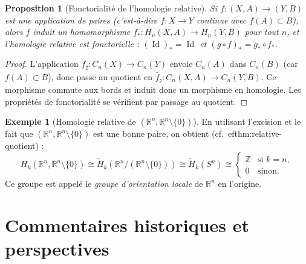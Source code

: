\documentclass[12pt,a4paper,openany]{book}
\theoremstyle{definition}
\newtheorem{exemple}[definition]{Exemple}
\theoremstyle{plain}
\newtheorem{proposition}[definition]{Proposition}
\theoremstyle{remark}
\newcommand{\Z}{\mathbb{Z}}
\newcommand{\R}{\mathbb{R}}
\DeclareMathOperator{\Id}{Id}
\begin{document}
\begin{proposition}[Fonctorialité de l'homologie relative]\label{prop:fonctorialite-relative}
Si $f \colon (X, A) \to (Y, B)$ est une application de paires (c'est-à-dire $f \colon X \to Y$
continue avec $f(A) \subset B$), alors $f$ induit un homomorphisme
$f_* \colon H_n(X, A) \to H_n(Y, B)$ pour tout $n$, et l'homologie relative est fonctorielle :
$(\Id)_* = \Id$ et $(g \circ f)_* = g_* \circ f_*$.
\end{proposition}

\begin{proof}
L'application $f_\sharp \colon C_n(X) \to C_n(Y)$ envoie $C_n(A)$ dans $C_n(B)$ (car $f(A) \subset B$),
donc passe au quotient en $\bar{f}_\sharp \colon C_n(X,A) \to C_n(Y,B)$. Ce morphisme commute
aux bords et induit donc un morphisme en homologie. Les propriétés de fonctorialité se vérifient
par passage au quotient.
\end{proof}

\begin{exemple}[Homologie relative de $(\R^n, \R^n \setminus \{0\})$]\label{ex:homologie-relative-Rn}
En utilisant l'excision et le fait que $(\R^n, \R^n \setminus \{0\})$ est une bonne paire,
on obtient (cf.\ 
ef{thm:relative-quotient}) :
\[
  H_k(\R^n, \R^n \setminus \{0\}) \cong \widetilde{H}_k(\R^n / (\R^n \setminus \{0\})) \cong \widetilde{H}_k(S^n) \cong \begin{cases} \Z & \text{si } k = n, \\ 0 & \text{sinon.} \end{cases}
\]
Ce groupe est appelé le \emph{groupe d'orientation locale} de $\R^n$ en l'origine.
\end{exemple}

\section{Commentaires historiques et perspectives}\label{sec:perspectives-ch5}
\end{document}
